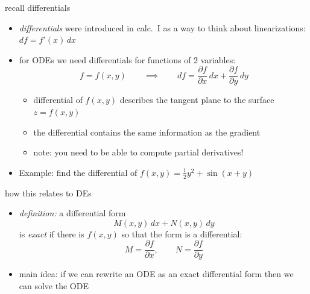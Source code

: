 \documentclass{beamer}
\begin{document}
\begin{frame}{recall differentials}

\begin{itemize}
\item \emph{differentials} were introduced in calc.~I as a way to think about linearizations: $df = f'(x)\,dx$
\item for ODEs we need differentials for functions of 2 variables:
    $$f=f(x,y) \qquad \implies \qquad df = \frac{\partial f}{\partial x}\,dx + \frac{\partial f}{\partial y}\,dy$$

\vspace{-2mm}
    \begin{itemize}
    \item differential of $f(x,y)$ describes the tangent plane to the surface $z=f(x,y)$
    \item the differential contains the same information as the gradient
    \item \alert{note:} you need to be able to compute partial derivatives!
    \end{itemize}
\item Example: find the differential of $f(x,y)=\frac{1}{2} y^2 + \sin(x+y)$

\vspace{20mm}
\end{itemize}
\end{frame}


\begin{frame}{how this relates to DEs}

\begin{itemize}
\item \emph{definition:}  a differential form
    $$M(x,y)\,dx + N(x,y)\,dy$$
is \emph{exact} if there is $f(x,y)$ so that the form is a differential:
    $$M = \frac{\partial f}{\partial x}, \qquad N = \frac{\partial f}{\partial y}$$
\item \alert{main idea:} if we can rewrite an ODE as an exact differential form then we can solve the ODE
\end{itemize}
\end{frame}
\end{document}
